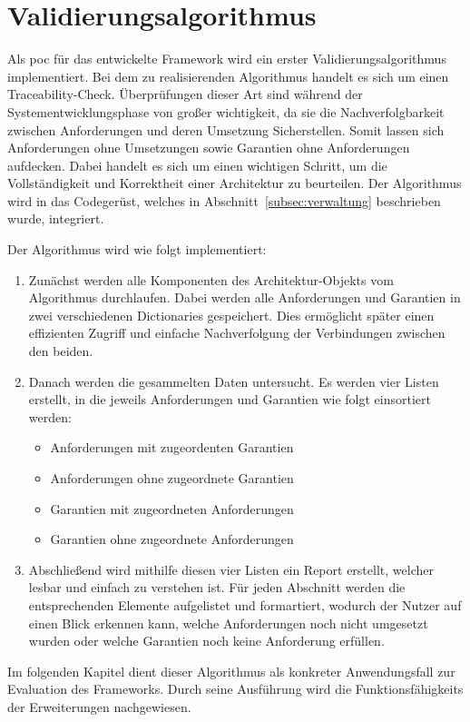 \section{Validierungsalgorithmus}
\label{sec:validimp}

Als \gls{poc} für das entwickelte Framework wird ein erster Validierungsalgorithmus implementiert. Bei dem zu realisierenden Algorithmus handelt es sich um einen Traceability-Check. Überprüfungen dieser Art sind während der Systementwicklungsphase von großer wichtigkeit, da sie die Nachverfolgbarkeit zwischen Anforderungen und deren Umsetzung Sicherstellen. Somit lassen sich Anforderungen ohne Umsetzungen sowie Garantien ohne Anforderungen aufdecken. Dabei handelt es sich um einen wichtigen Schritt, um die Vollständigkeit und Korrektheit einer Architektur zu beurteilen. Der Algorithmus wird in das Codegerüst, welches in Abschnitt~\ref{subsec:verwaltung} beschrieben wurde, integriert.

Der Algorithmus wird wie folgt implementiert:
\begin{enumerate}
  \item Zunächst werden alle Komponenten des Architektur-Objekts vom Algorithmus durchlaufen. Dabei werden alle Anforderungen und Garantien in zwei verschiedenen Dictionaries gespeichert. Dies ermöglicht später einen effizienten Zugriff und einfache Nachverfolgung der Verbindungen zwischen den beiden.
  \item Danach werden die gesammelten Daten untersucht. Es werden vier Listen erstellt, in die jeweils Anforderungen und Garantien wie folgt einsortiert werden:
        \begin{itemize}
          \item Anforderungen mit zugeordenten Garantien
          \item Anforderungen ohne zugeordnete Garantien
          \item Garantien mit zugeordneten Anforderungen
          \item Garantien ohne zugeordnete Anforderungen
        \end{itemize}
  \item Abschließend wird mithilfe diesen vier Listen ein Report erstellt, welcher lesbar und einfach zu verstehen ist. Für jeden Abschnitt werden die entsprechenden Elemente aufgelistet und formartiert, wodurch der Nutzer auf einen Blick erkennen kann, welche Anforderungen noch nicht umgesetzt wurden oder welche Garantien noch keine Anforderung erfüllen.
\end{enumerate}

Im folgenden Kapitel dient dieser Algorithmus als konkreter Anwendungsfall zur Evaluation des Frameworks. Durch seine Ausführung wird die Funktionsfähigkeits der Erweiterungen nachgewiesen.